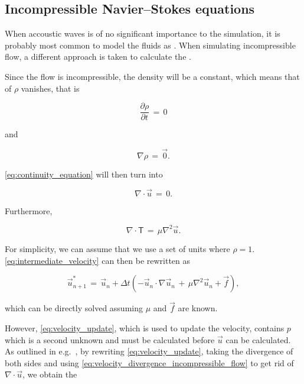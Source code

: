\subsection{Incompressible Navier--Stokes equations}

When accoustic waves is of no significant importance to the simulation, it is probably most common to model the fluids as \incompressible. When simulating incompressible flow, a different approach is taken to calculate the .

Since the flow is incompressible, the density will be a constant, which means that \derivatives of $\rho$ vanishes, that is

\begin{equation} \label{eq:density_partial_time_derivative_incompressible_flow}
\frac{\partial \rho}{\partial t} \,=\, 0
\end{equation}

and

\begin{equation} \label{eq:density_divergence_incompressible_flow}
\nabla\rho \,=\, \vec{0}.
\end{equation}

\eqref{eq:continuity_equation} will then turn into

\begin{equation} \label{eq:velocity_divergence_incompressible_flow}
\nabla\cdot\vec{u} \,=\, 0.
\end{equation}

Furthermore, %

\begin{equation} \label{eq:deviatoric_stress_tensor_incompressible_flow}
\nabla\cdot\boldsymbol{\mathsf{T}} \,=\, \mu\nabla^2\vec{u}.
\end{equation}

For simplicity, we can assume that we use a set of units where $\rho = 1$. \eqref{eq:intermediate_velocity} can then be rewritten as

\begin{equation} \label{eq:intermediate_velocity_reduced}
\vec{u}^*_{n+1} \,= \, \vec{u}_{n} + \Delta t(- \vec{u}_{n}\cdot\nabla\vec{u}_{n} \,+\, \mu\nabla^2\vec{u}_{n} + \vec{f}),
\end{equation}

which can be directly solved assuming $\mu$ and $\vec{f}$ are known.

However, \eqref{eq:velocity_update}, which is used to update the velocity, contains $p$ which is a second unknown and must be calculated before $\vec{u}$ can be calculated. As outlined in e.g.\ \citep{Losasso2004}, by rewriting \eqref{eq:velocity_update}, taking the divergence of both sides and using \eqref{eq:velocity_divergence_incompressible_flow} to get rid of $\nabla\cdot\vec{u}$, we obtain the 

